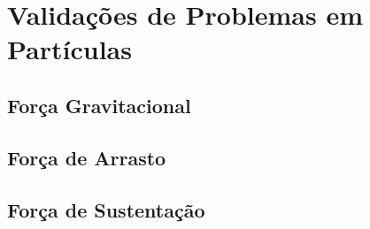 \section{\textbf{Validações de Problemas em Partículas}}
\subsection{\textbf{Força Gravitacional}}
\subsection{\textbf{Força de Arrasto}}
\subsection{\textbf{Força de Sustentação}}